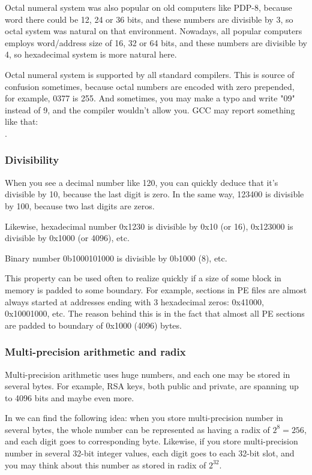 Octal numeral system was also popular on old computers like PDP-8, because word there could be 12, 24 or 36 bits, and these numbers are divisible by 3, so octal system was natural on that environment.
Nowadays, all popular computers employs word/address size of 16, 32 or 64 bits, and these numbers are divisible by 4, so hexadecimal system is more natural here.

Octal numeral system is supported by all standard \CCpp compilers.
This is source of confusion sometimes, because octal numbers are encoded with zero prepended, for example, 0377 is 255.
And sometimes, you may make a typo and write "09" instead of 9, and the compiler wouldn't allow you.
GCC may report something like that:\\
.

\subsubsection{Divisibility}

When you see a decimal number like 120, you can quickly deduce that it's divisible by 10, because the last digit is zero.
In the same way, 123400 is divisible by 100, because two last digits are zeros.

Likewise, hexadecimal number 0x1230 is divisible by 0x10 (or 16), 0x123000 is divisible by 0x1000 (or 4096), etc.

Binary number 0b1000101000 is divisible by 0b1000 (8), etc.

This property can be used often to realize quickly if a size of some block in memory is padded to some boundary.
For example, sections in \ac{PE} files are almost always started at addresses ending with 3 hexadecimal zeros: 0x41000, 0x10001000, etc.
The reason behind this is in the fact that almost all \ac{PE} sections are padded to boundary of 0x1000 (4096) bytes.

\subsubsection{Multi-precision arithmetic and radix}

Multi-precision arithmetic uses huge numbers, and each one may be stored in several bytes.
For example, RSA keys, both public and private, are spanning up to 4096 bits and maybe even more.

In  we can find the following idea: when you store multi-precision number in several bytes,
the whole number can be represented as having a radix of $2^8=256$, and each digit goes to corresponding byte.
Likewise, if you store multi-precision number in several 32-bit integer values, each digit goes to each 32-bit slot,
and you may think about this number as stored in radix of $2^{32}$.

